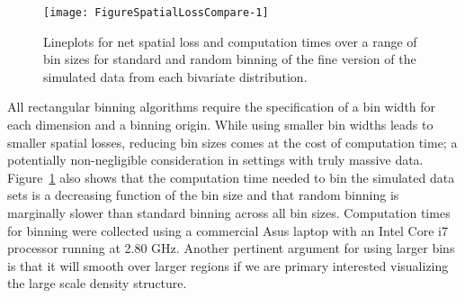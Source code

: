 \documentclass[11pt]{isuthesis}\usepackage[]{graphicx}\usepackage[]{color}
\newenvironment{knitrout}{}{} %
\begin{document}
\begin{knitrout}
\color{fgcolor}\begin{figure}[h]

{\centering \texttt{[image: FigureSpatialLossCompare-1]} 

}

\caption[Lineplots for net spatial loss and computation times over a range of bin sizes for standard and random binning of the fine version of the simulated data from each bivariate distribution]{Lineplots for net spatial loss and computation times over a range of bin sizes for standard and random binning of the fine version of the simulated data from each bivariate distribution.}\label{fig:SpatialLossCompare}
\end{figure}


\end{knitrout}

All rectangular binning algorithms require the specification of a bin width for each dimension and a binning origin. While using smaller bin widths leads to smaller spatial losses, reducing bin sizes comes at the cost of computation time; a potentially non-negligible consideration in settings with truly massive data. Figure~\ref{fig:SpatialLossCompare} also shows that the computation time needed to bin the simulated data sets is a decreasing function of the bin size and that random binning is marginally slower than standard binning across all bin sizes. Computation times for binning were collected using a commercial Asus laptop with an Intel Core i7 processor running at 2.80 GHz. Another pertinent argument for using larger bins is that it will smooth over larger regions if we are primary interested visualizing the large scale density structure.
\end{document}
